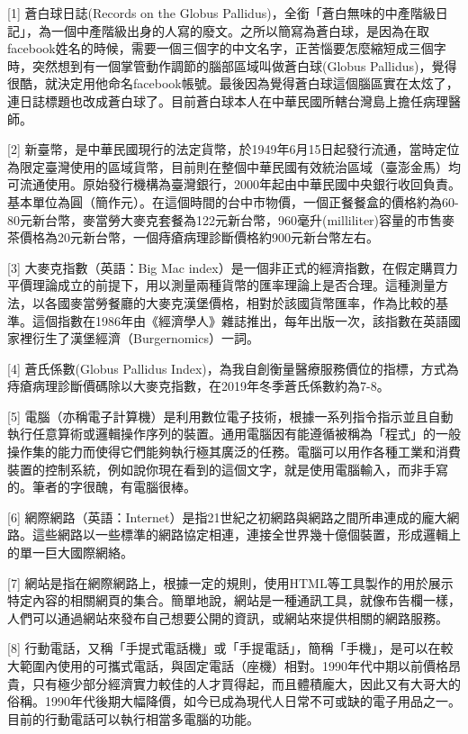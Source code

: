 \documentclass[
]{article}
\begin{document}
{[}1{]} 蒼白球日誌(Records on the Globus
Pallidus)，全銜「蒼白無味的中產階級日記」，為一個中產階級出身的人寫的廢文。之所以簡寫為蒼白球，是因為在取facebook姓名的時候，需要一個三個字的中文名字，正苦惱要怎麼縮短成三個字時，突然想到有一個掌管動作調節的腦部區域叫做蒼白球(Globus
Pallidus)，覺得很酷，就決定用他命名facebook帳號。最後因為覺得蒼白球這個腦區實在太炫了，連日誌標題也改成蒼白球了。目前蒼白球本人在中華民國所轄台灣島上擔任病理醫師。

{[}2{]}
新臺幣，是中華民國現行的法定貨幣，於1949年6月15日起發行流通，當時定位為限定臺灣使用的區域貨幣，目前則在整個中華民國有效統治區域（臺澎金馬）均可流通使用。原始發行機構為臺灣銀行，2000年起由中華民國中央銀行收回負責。基本單位為圓（簡作元）。在這個時間的台中市物價，一個正餐餐盒的價格約為60-80元新台幣，麥當勞大麥克套餐為122元新台幣，960毫升(milliliter)容量的市售麥茶價格為20元新台幣，一個痔瘡病理診斷價格約900元新台幣左右。

{[}3{]} 大麥克指數（英語：Big Mac
index）是一個非正式的經濟指數，在假定購買力平價理論成立的前提下，用以測量兩種貨幣的匯率理論上是否合理。這種測量方法，以各國麥當勞餐廳的大麥克漢堡價格，相對於該國貨幣匯率，作為比較的基準。這個指數在1986年由《經濟學人》雜誌推出，每年出版一次，該指數在英語國家裡衍生了漢堡經濟（Burgernomics）一詞。

{[}4{]} 蒼氏係數(Globus Pallidus
Index)，為我自創衡量醫療服務價位的指標，方式為痔瘡病理診斷價碼除以大麥克指數，在2019年冬季蒼氏係數約為7-8。

{[}5{]}
電腦（亦稱電子計算機）是利用數位電子技術，根據一系列指令指示並且自動執行任意算術或邏輯操作序列的裝置。通用電腦因有能遵循被稱為「程式」的一般操作集的能力而使得它們能夠執行極其廣泛的任務。電腦可以用作各種工業和消費裝置的控制系統，例如說你現在看到的這個文字，就是使用電腦輸入，而非手寫的。筆者的字很醜，有電腦很棒。

{[}6{]}
網際網路（英語：Internet）是指21世紀之初網路與網路之間所串連成的龐大網路。這些網路以一些標準的網路協定相連，連接全世界幾十億個裝置，形成邏輯上的單一巨大國際網絡。

{[}7{]}
網站是指在網際網路上，根據一定的規則，使用HTML等工具製作的用於展示特定內容的相關網頁的集合。簡單地說，網站是一種通訊工具，就像布告欄一樣，人們可以通過網站來發布自己想要公開的資訊，或網站來提供相關的網路服務。

{[}8{]}
行動電話，又稱「手提式電話機」或「手提電話」，簡稱「手機」，是可以在較大範圍內使用的可攜式電話，與固定電話（座機）相對。1990年代中期以前價格昂貴，只有極少部分經濟實力較佳的人才買得起，而且體積龐大，因此又有大哥大的俗稱。1990年代後期大幅降價，如今已成為現代人日常不可或缺的電子用品之一。目前的行動電話可以執行相當多電腦的功能。
\end{document}
